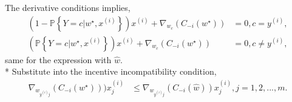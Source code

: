 \documentclass{article}
\begin{document}
The derivative conditions implies,
\begin{align*}
\left(1 - \mathbb{P}\left\{Y = c | w^\star , x^{\left(i\right)}\right\}\right) x^{\left(i\right)} + \nabla _{w_{c}} \left(C_{-i}\left(w^\star \right)\right) &= 0, c = y^{\left(i\right)},
\\ \left(\mathbb{P}\left\{Y = c | w^\star , x^{\left(i\right)}\right\}\right) x^{\left(i\right)} + \nabla _{w_{c}} \left(C_{-i}\left(w^\star \right)\right) &= 0, c \neq  y^{\left(i\right)},
\end{align*}
same for the expression with $\hat{w}$.
\\* Substitute into the incentive incompatibility condition,
\begin{align*}
\nabla _{w_{y^{\left(i\right)}j}} \left(C_{-i}\left(w^\star \right)\right)) x^{\left(i\right)}_{j} &\leq  \nabla _{w_{y^{\left(i\right)}j}} \left(C_{-i}\left(\hat{w}\right)\right) x^{\left(i\right)}_{j}, j = 1, 2, ..., m. 
\end{align*}
\end{document}
